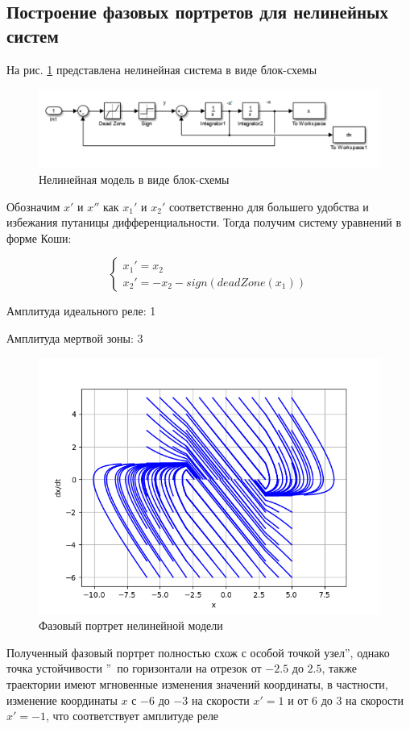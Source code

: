 \subsection{Построение фазовых портретов для нелинейных систем}

На рис. \ref{fig:17} представлена нелинейная система в виде блок-схемы

\begin{figure}[H]
	\centering
	\includegraphics[width=1\linewidth]{body/images/simulink_scheme.png}
	\caption{Нелинейная модель в виде блок-схемы}
	\label{fig:17}
\end{figure}

Обозначим $x'$ и $x''$ как $x_1'$ и $x_2'$ соответственно для большего удобства и избежания путаницы дифференциальности. 
Тогда получим систему уравнений в форме Коши:

$$
\begin{cases}
	x_1' = x_2\\
	x_2' = - x_2 - sign(deadZone(x_1))
\end{cases}
$$

Амплитуда идеального реле: 1

Амплитуда мертвой зоны: 3

\begin{figure}[H]
	\centering
	\includegraphics[width=0.7\linewidth]{body/images/Simulink-system.png}
	\caption{Фазовый портрет нелинейной модели}
	\label{fig:18}
\end{figure}

Полученный фазовый портрет полностью схож с особой точкой  узел\textquotedblright, однако точка устойчивости
\textquotedblright\ по горизонтали на отрезок от $-2.5$ до $2.5$, 
также траектории имеют мгновенные изменения значений координаты, в частности, изменение координаты
$x$ с $-6$ до $-3$ на скорости $x'=1$ и от $6$ до $3$ на скорости $x'=-1$, что соответствует амплитуде реле

